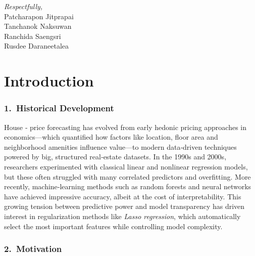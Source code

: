 \documentclass[12pt, a4paper]{report}
\begin{document}
\begin{flushright}
\textit{Respectfully,} \\
Patcharapon Jitprapai\\
Tanchanok Naksuwan  \\
Ranchida Saengsri \\
Rusdee Daraneetalea  \\
\end{flushright}

\vspace{1cm}

\tableofcontents
\newpage



\chapter*{Introduction}

\subsection*{1.~Historical Development}

\noindent
\par House ‐ price forecasting has evolved from early hedonic pricing approaches in economics—which quantified how factors like location, floor area and neighborhood amenities influence value—to modern data‐driven techniques powered by big, structured real‐estate datasets. In the 1990s and 2000s, researchers experimented with classical linear and nonlinear regression models, but these often struggled with many correlated predictors and overfitting. More recently, machine‐learning methods such as random forests and neural networks have achieved impressive accuracy, albeit at the cost of interpretability. This growing tension between predictive power and model transparency has driven interest in regularization methods like \textit{Lasso regression}, which automatically select the most important features while controlling model complexity.

\bigskip

\subsection*{2.~Motivation}
\end{document}
